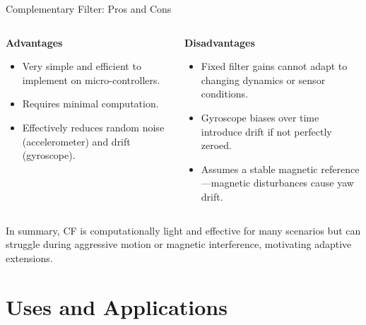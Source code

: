 \documentclass[aspectratio=169,xcolor=dvipsnames]{beamer}
\begin{document}
\begin{frame}{Complementary Filter: Pros and Cons}
\begin{columns}[T,onlytextwidth]
  \begin{column}{0.48\textwidth}
    \begin{block}{\textbf{Advantages}}
      \begin{itemize}
        \item Very simple and efficient to implement on micro-controllers.
        \item Requires minimal computation.
        \item Effectively reduces random noise (accelerometer) and drift (gyroscope)\cite{valentiCF2015}.
      \end{itemize}
    \end{block}
  \end{column}
  \begin{column}{0.48\textwidth}
    \begin{block}{\textbf{Disadvantages}}
      \begin{itemize}
        \item Fixed filter gains cannot adapt to changing dynamics or sensor conditions.
        \item Gyroscope biases over time introduce drift if not perfectly zeroed.
        \item Assumes a stable magnetic reference—magnetic disturbances cause yaw drift.
      \end{itemize}
    \end{block}
  \end{column}
\end{columns}

\vspace{0.5em}
In summary, CF is computationally light and effective for many scenarios but can struggle during aggressive motion or magnetic interference, motivating adaptive extensions.
\end{frame}


\section{Uses and Applications}
\end{document}
